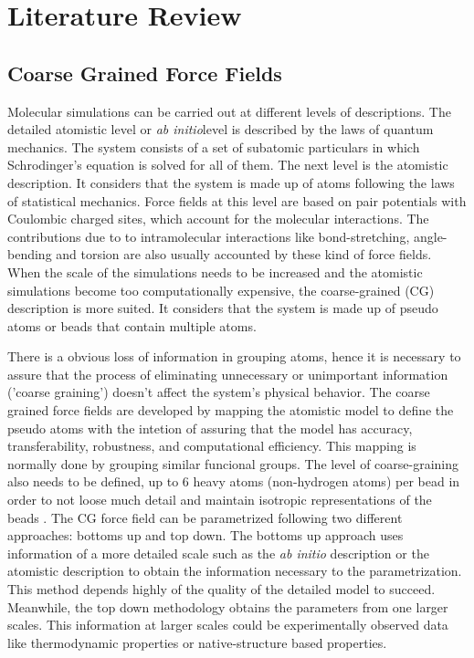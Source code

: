 
\chapter{Literature Review} %

\label{Chapter1} %


\section{Coarse Grained Force Fields}

Molecular simulations can be carried out at different levels of descriptions. The detailed atomistic level or \textit{ab initio}level is described by the laws of quantum mechanics. The system consists of a set of subatomic particulars in which Schrodinger's equation is solved for all of them. The next level is the atomistic description. It considers that the system is made up of atoms following the laws of statistical mechanics.  Force fields at this level are based on pair potentials with Coulombic charged sites, which account for the molecular interactions. The contributions due to to intramolecular interactions like bond-stretching, angle-bending and torsion are also usually accounted by these kind of force fields. When the scale of the simulations needs to be increased and the atomistic simulations become too computationally expensive, the coarse-grained (CG) description is more suited. It considers that the system is made up of pseudo atoms or beads that contain multiple atoms. 

There is a obvious loss of information in grouping atoms, hence it is necessary to assure that the process of eliminating unnecessary or unimportant information ('coarse graining') doesn't affect the system's physical behavior. The coarse grained force fields are developed by mapping the atomistic model to define the pseudo atoms with the intetion of assuring that the model has accuracy, transferability, robustness, and computational efficiency. This mapping is normally done by grouping similar funcional groups. The level of coarse-graining also needs to be defined, up to 6 heavy atoms (non-hydrogen atoms) per bead in order to not loose much detail and maintain isotropic representations of the beads \cite{shinoda2007,martini2007,hadley2012}. The CG force field can be parametrized following two different approaches: bottoms up and top down. The bottoms up approach uses information of a more detailed scale such as the \textit{ab initio} description or the atomistic description to obtain the information necessary to the parametrization. This method depends highly of the quality of the detailed model to succeed. Meanwhile, the top down methodology obtains the parameters from one larger scales. This information at larger scales could be experimentally observed data like thermodynamic properties or native-structure based properties. 

